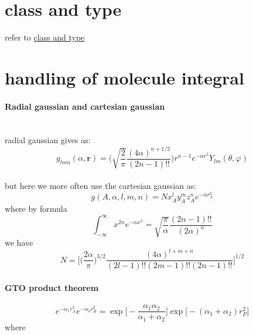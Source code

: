 \documentclass[11pt]{article}
\begin{document}
    \section{class and type}\label{class-and-type}

refer to \href{}{class and type}

    \section{handling of molecule
integral}\label{handling-of-molecule-integral}

    \paragraph{Radial gaussian and cartesian
gaussian}\label{radial-gaussian-and-cartesian-gaussian}
\\

radial gaussian gives as:\\
\[ g_{lmn}(\alpha, \mathbf{r}) = \Big(\sqrt{\frac{2}{\pi}} \frac{(4\alpha)^{n+1/2}}{(2n-1)!!}\Big) r^{n-1}e^{-\alpha r^2} Y_{lm}(\theta, \varphi) \]\\
but here we more often use the cartesian gaussian as:\\
\[ g(A,\alpha, l,m,n) = N x_A^l y_A^m z_A^n e^{-\alpha r_A^2} \] where
by formula\\
\[\int_{-\infty}^{\infty}x^{2n}e^{-\alpha x^2}=\sqrt{\frac{\pi}{\alpha}}\frac{(2n-1)!!}{(2\alpha)^n}\]
we have
\[ N =\big[\big(\frac{2\alpha}{\pi}\big)^{3/2}\frac{(4\alpha)^{l+m+n}}{(2l-1)!!(2m-1)!!(2n-1)!!} \big]^{1/2}\]

    \paragraph{GTO product theorem}\label{gto-product-theorem}

\[ e^{-\alpha_1 r_A^2}e^{-\alpha_2 r_B^2} = \exp\big[-\frac{\alpha_1\alpha_2}{\alpha_1+\alpha_2}\big]\exp\big[-(\alpha_1+\alpha_2)r_P^2 \big] \]
where
\end{document}
